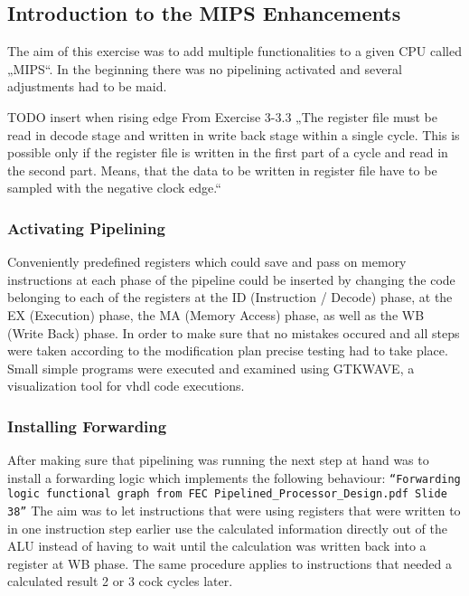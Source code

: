 


\subsection{Introduction to the MIPS Enhancements}
\label{sec:introductionToEnhancements}

The aim of this exercise was to add multiple functionalities to a given CPU called „MIPS“. In the beginning there was no pipelining activated and several adjustments had to be maid.

TODO insert when rising edge
From Exercise 3-3.3 „The register file must be read in decode stage and written in write back stage within a single cycle. This is possible only if the register file is written in the first part of a cycle and read in the second part. Means, that the data to be written in register file have to be sampled with the negative clock edge.“


\subsubsection{Activating Pipelining}
\label{sec:activatingPipelining}

Conveniently predefined registers which could save and pass on memory instructions at each phase of the pipeline could be inserted by changing the code belonging to each of the registers at the ID (Instruction / Decode) phase, at the EX (Execution) phase, the MA (Memory Access) phase, as well as the WB (Write Back) phase.
In order to make sure that no mistakes occured and all steps were taken according to the modification plan precise testing had to take place. Small simple programs were executed and examined using GTKWAVE, a visualization tool for vhdl code executions. 

\subsubsection{Installing Forwarding}
\label{sec:installingForwarding}

After making sure that pipelining was running the next step at hand was to install a forwarding logic which implements the following behaviour:
\texttt{``Forwarding logic functional graph from FEC \– Pipelined\_Processor\_Design.pdf Slide 38''}
The aim was to let instructions that were using registers that were written to in one instruction step earlier use the calculated information directly out of the ALU instead of having to wait until the calculation was written back into a register at WB phase.
The same procedure applies to instructions that needed a calculated result 2 or 3 cock cycles later.
 
